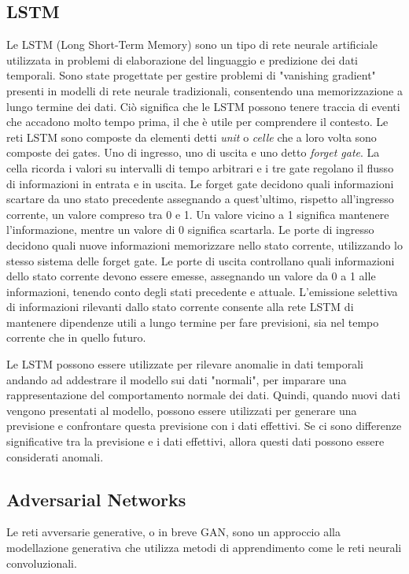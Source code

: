 \subsection{LSTM}
Le LSTM (Long Short-Term Memory) sono un tipo di rete neurale artificiale utilizzata in problemi di elaborazione del linguaggio e predizione dei dati temporali. Sono state progettate per gestire problemi di "vanishing gradient" presenti in modelli di rete neurale tradizionali, consentendo una memorizzazione a lungo termine dei dati. Ciò significa che le LSTM possono tenere traccia di eventi che accadono molto tempo prima, il che è utile per comprendere il contesto.
Le reti LSTM sono composte da elementi detti \textit{unit} o \textit{celle} che a loro volta sono composte dei gates. Uno di ingresso, uno di uscita e uno detto \textit{forget gate}. La cella ricorda i valori su intervalli di tempo arbitrari e i tre gate regolano il flusso di informazioni in entrata e in uscita. Le forget gate decidono quali informazioni scartare da uno stato precedente assegnando a quest'ultimo, rispetto all'ingresso corrente, un valore compreso tra 0 e 1. Un valore vicino a 1 significa mantenere l'informazione, mentre un valore di 0 significa scartarla. Le porte di ingresso decidono quali nuove informazioni memorizzare nello stato corrente, utilizzando lo stesso sistema delle forget gate. Le porte di uscita controllano quali informazioni dello stato corrente devono essere emesse, assegnando un valore da 0 a 1 alle informazioni, tenendo conto degli stati precedente e attuale. L'emissione selettiva di informazioni rilevanti dallo stato corrente consente alla rete LSTM di mantenere dipendenze utili a lungo termine per fare previsioni, sia nel tempo corrente che in quello futuro.

Le LSTM possono essere utilizzate per rilevare anomalie in dati temporali andando ad addestrare il modello sui dati "normali", per imparare una rappresentazione del comportamento normale dei dati. Quindi, quando nuovi dati vengono presentati al modello, possono essere utilizzati per generare una previsione e confrontare questa previsione con i dati effettivi. Se ci sono differenze significative tra la previsione e i dati effettivi, allora questi dati possono essere considerati anomali.


\subsection{Adversarial Networks}
Le reti avversarie generative, o in breve GAN, sono un approccio alla modellazione generativa che utilizza metodi di apprendimento come le reti neurali convoluzionali.

